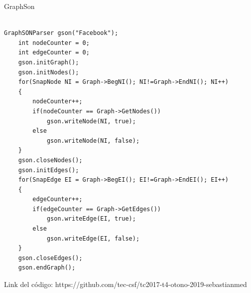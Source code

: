 \documentclass[book, 16 pt, conference]{ieeeconf}
\begin{document}
GraphSon

\begin{lstlisting}

GraphSONParser gson("Facebook");
    int nodeCounter = 0;
    int edgeCounter = 0;
    gson.initGraph();
    gson.initNodes();
    for(SnapNode NI = Graph->BegNI(); NI!=Graph->EndNI(); NI++)
    {
        nodeCounter++;
        if(nodeCounter == Graph->GetNodes())
            gson.writeNode(NI, true);
        else
            gson.writeNode(NI, false);
    }
    gson.closeNodes();
    gson.initEdges();
    for(SnapEdge EI = Graph->BegEI(); EI!=Graph->EndEI(); EI++)
    {
        edgeCounter++;
        if(edgeCounter == Graph->GetEdges())
            gson.writeEdge(EI, true);
        else
            gson.writeEdge(EI, false);
    }
    gson.closeEdges();
    gson.endGraph();

\end{lstlisting}

Link del código: https://github.com/tec-csf/tc2017-t4-otono-2019-sebastianmed
\end{document}
